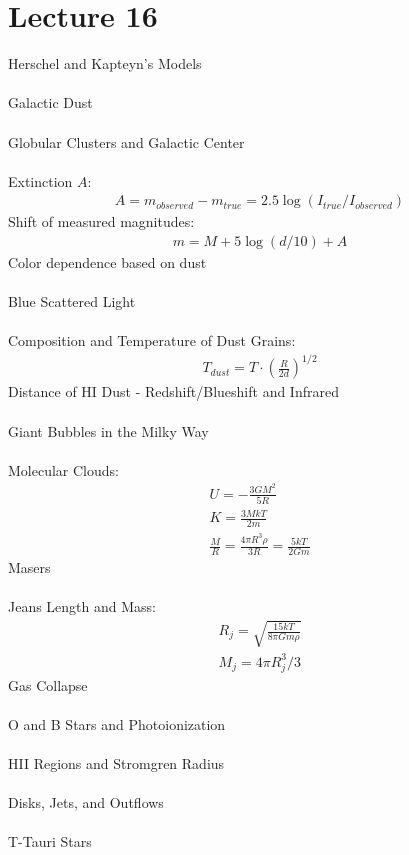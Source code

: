 \documentclass[11pt,reqno]{article}
\theoremstyle{definition}
\begin{document}
\section*{Lecture 16}
Herschel and Kapteyn's Models\\\\
Galactic Dust\\\\
Globular Clusters and Galactic Center\\\\
Extinction $A$:
\begin{align*}
    A = m_{observed} - m_{true} = 2.5 \log(I_{true}/ I_{observed})
\end{align*}
Shift of measured magnitudes:
\begin{align*}
    m = M + 5\log(d/10) + A
\end{align*}
Color dependence based on dust\\\\
Blue Scattered Light\\\\
Composition and Temperature of Dust Grains:
\begin{align*}
    T_{dust} = T \cdot (\frac{R}{2d})^{1/2}
\end{align*}
Distance of HI Dust - Redshift/Blueshift and Infrared\\\\
Giant Bubbles in the Milky Way\\\\
Molecular Clouds:
\begin{align*}
    U = -\frac{3GM^2}{5R}\\
    K = \frac{3MkT}{2m}\\
    \frac{M}{R} = \frac{4\pi R^3\rho}{3R} = \frac{5kT}{2Gm}
\end{align*}
Masers\\\\
Jeans Length and Mass:
\begin{align*}
    R_j = \sqrt{\frac{15kT}{8\pi Gm\rho}}\\
    M_j = 4\pi R_j^3 / 3
\end{align*}
Gas Collapse\\\\
O and B Stars and Photoionization\\\\
HII Regions and Stromgren Radius\\\\
Disks, Jets, and Outflows\\\\
T-Tauri Stars\\\\
\end{document}
